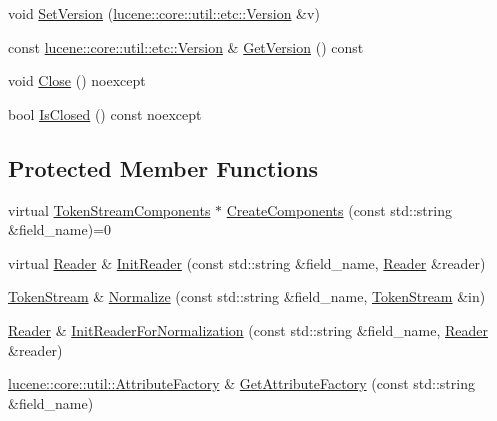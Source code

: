 \begin{DoxyCompactItemize}
\item 
void \mbox{\hyperlink{classlucene_1_1core_1_1analysis_1_1Analyzer_a9c0504cdb7f9e1fc8e4815505ce55683}{Set\+Version}} (\mbox{\hyperlink{classlucene_1_1core_1_1util_1_1etc_1_1Version}{lucene\+::core\+::util\+::etc\+::\+Version}} \&v)
\item 
const \mbox{\hyperlink{classlucene_1_1core_1_1util_1_1etc_1_1Version}{lucene\+::core\+::util\+::etc\+::\+Version}} \& \mbox{\hyperlink{classlucene_1_1core_1_1analysis_1_1Analyzer_a1679f175b96b88508c148f6d8872623d}{Get\+Version}} () const
\item 
void \mbox{\hyperlink{classlucene_1_1core_1_1analysis_1_1Analyzer_a5c80fc8a7e06ebd552d9d4e42d7466ad}{Close}} () noexcept
\item 
bool \mbox{\hyperlink{classlucene_1_1core_1_1analysis_1_1Analyzer_a3a533567be4805332be57160b0364b79}{Is\+Closed}} () const noexcept
\end{DoxyCompactItemize}
\subsection*{Protected Member Functions}
\begin{DoxyCompactItemize}
\item 
virtual \mbox{\hyperlink{classlucene_1_1core_1_1analysis_1_1TokenStreamComponents}{Token\+Stream\+Components}} $\ast$ \mbox{\hyperlink{classlucene_1_1core_1_1analysis_1_1Analyzer_a9b7dc3c598057fbf4e9b5f48066cb54a}{Create\+Components}} (const std\+::string \&field\+\_\+name)=0
\item 
virtual \mbox{\hyperlink{classlucene_1_1core_1_1analysis_1_1Reader}{Reader}} \& \mbox{\hyperlink{classlucene_1_1core_1_1analysis_1_1Analyzer_aed8b22b06eab4ecd4f3d568cadab8b09}{Init\+Reader}} (const std\+::string \&field\+\_\+name, \mbox{\hyperlink{classlucene_1_1core_1_1analysis_1_1Reader}{Reader}} \&reader)
\item 
\mbox{\hyperlink{classlucene_1_1core_1_1analysis_1_1TokenStream}{Token\+Stream}} \& \mbox{\hyperlink{classlucene_1_1core_1_1analysis_1_1Analyzer_a9c76b9071c95ee8347b0f8ae2a208e6e}{Normalize}} (const std\+::string \&field\+\_\+name, \mbox{\hyperlink{classlucene_1_1core_1_1analysis_1_1TokenStream}{Token\+Stream}} \&in)
\item 
\mbox{\hyperlink{classlucene_1_1core_1_1analysis_1_1Reader}{Reader}} \& \mbox{\hyperlink{classlucene_1_1core_1_1analysis_1_1Analyzer_ae261718804348d65059b44feb6349496}{Init\+Reader\+For\+Normalization}} (const std\+::string \&field\+\_\+name, \mbox{\hyperlink{classlucene_1_1core_1_1analysis_1_1Reader}{Reader}} \&reader)
\item 
\mbox{\hyperlink{classlucene_1_1core_1_1util_1_1AttributeFactory}{lucene\+::core\+::util\+::\+Attribute\+Factory}} \& \mbox{\hyperlink{classlucene_1_1core_1_1analysis_1_1Analyzer_af0c3e02aef0e7a391b0abdbca218951b}{Get\+Attribute\+Factory}} (const std\+::string \&field\+\_\+name)
\end{DoxyCompactItemize}
